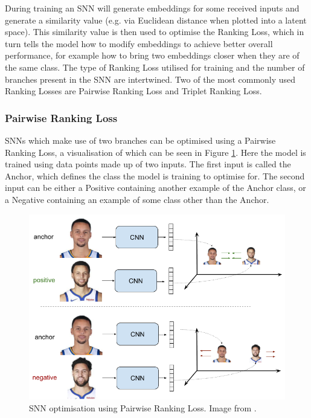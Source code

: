 During training an SNN will generate embeddings for some received inputs and generate a similarity value (e.g. via Euclidean distance when plotted into a latent space). This similarity value is then used to optimise the Ranking Loss, which in turn tells the model how to modify embeddings to achieve better overall performance, for example how to bring two embeddings closer when they are of the same class. The type of Ranking Loss utilised for training and the number of branches present in the SNN are intertwined. Two of the most commonly used Ranking Losses are Pairwise Ranking Loss and Triplet Ranking Loss.

\subsubsection{Pairwise Ranking Loss}\label{ch:ID,sec:SNNBackground,sub:lossFunction,subsub:Pairwise}

SNNs which make use of two branches can be optimised using a Pairwise Ranking Loss, a visualisation of which can be seen in Figure \ref{fig:pairwise_ranking_loss_faces}. Here the model is trained using data points made up of two inputs. The first input is called the Anchor, which defines the class the model is training to optimise for. The second input can be either a Positive containing another example of the Anchor class, or a Negative containing an example of some class other than the Anchor. 

\begin{figure}[h]
	\begin{center}
		\includegraphics[scale=0.5]{Chapter5/figs/pairwise_ranking_loss_faces.png}
	\end{center}
	\caption[SNN optimisation using Pairwise Ranking Loss.]{SNN optimisation using Pairwise Ranking Loss. Image from \cite{gomez_understanding_2019}.}
	\label{fig:pairwise_ranking_loss_faces}
\end{figure}

